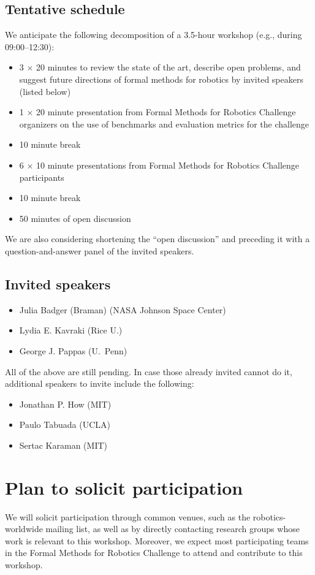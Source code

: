 \documentclass{amsart}
\begin{document}
\subsection{Tentative schedule}
We anticipate the following decomposition of a 3.5-hour workshop (e.g., during 09:00--12:30):
\begin{itemize}
\item 3 $\times$ 20 minutes to review the state of the art, describe open problems, and suggest future directions of formal methods for robotics by invited speakers (listed below)
\item 1 $\times$ 20 minute presentation from Formal Methods for Robotics Challenge organizers on the use of benchmarks and evaluation metrics for the challenge 
\item 10 minute break
\item 6 $\times$ 10 minute presentations from Formal Methods for Robotics Challenge participants
\item 10 minute break
\item 50 minutes of open discussion
\end{itemize}
We are also considering shortening the ``open discussion'' and preceding it
with a question-and-answer panel of the invited speakers.

\subsection{Invited speakers}
\begin{itemize}
\item Julia Badger (Braman) (NASA Johnson Space Center)
\item Lydia E. Kavraki (Rice U.)
\item George J. Pappas (U.~Penn)
\end{itemize}
All of the above are still pending.  In case those already invited cannot do it,
additional speakers to invite include the following:
\begin{itemize}
\item Jonathan P. How (MIT)
\item Paulo Tabuada (UCLA)
\item Sertac Karaman (MIT)
\end{itemize}

\section{Plan to solicit participation}
We will solicit participation through common venues, such as the
robotics-worldwide mailing list, as well as by directly contacting research
groups whose work is relevant to this workshop. Moreover, we expect most
participating teams in the Formal Methods for Robotics Challenge to attend and
contribute to this workshop.
\end{document}
